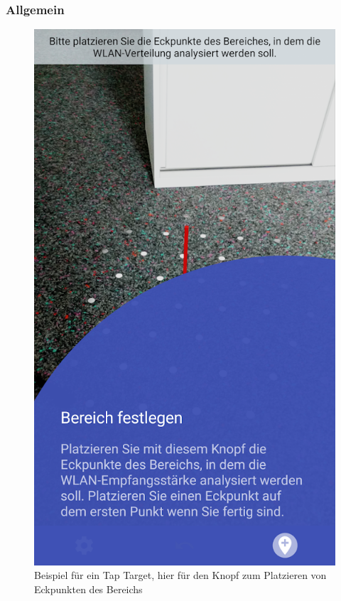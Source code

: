 \documentclass[10pt]{scrartcl}
\begin{document}
\subsubsection{Allgemein}
\begin{figure}
\centering
\includegraphics[scale=0.35]{images/tap_target.png}
\caption{\label{img:tap_target}Beispiel für ein Tap Target, hier für den Knopf zum Platzieren von Eckpunkten des Bereichs}
\end{figure}
\end{document}
